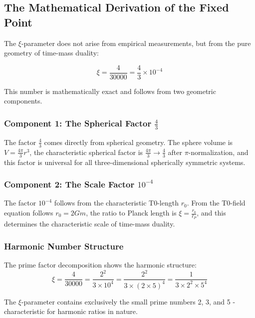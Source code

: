 \documentclass[12pt,a4paper]{report}
\begin{document}
	\subsection{The Mathematical Derivation of the Fixed Point}
	
	The $\xi$-parameter does not arise from empirical measurements, but from the pure geometry of time-mass duality:
	
	\begin{equation}
		\xi = \frac{4}{30000} = \frac{4}{3} \times 10^{-4}
	\end{equation}
	
	This number is mathematically exact and follows from two geometric components.
	
	\subsubsection{Component 1: The Spherical Factor $\frac{4}{3}$}
	
	The factor $\frac{4}{3}$ comes directly from spherical geometry. The sphere volume is $V = \frac{4\pi}{3}r^3$, the characteristic spherical factor is $\frac{4\pi}{3} \rightarrow \frac{4}{3}$ after $\pi$-normalization, and this factor is universal for all three-dimensional spherically symmetric systems.
	
	\subsubsection{Component 2: The Scale Factor $10^{-4}$}
	
	The factor $10^{-4}$ follows from the characteristic T0-length $r_0$. From the T0-field equation follows $r_0 = 2Gm$, the ratio to Planck length is $\xi = \frac{r_0}{\ell_P}$, and this determines the characteristic scale of time-mass duality.
	
	\subsubsection{Harmonic Number Structure}
	
	The prime factor decomposition shows the harmonic structure:
	\begin{equation}
		\xi = \frac{4}{30000} = \frac{2^2}{3 \times 10^4} = \frac{2^2}{3 \times (2 \times 5)^4} = \frac{1}{3 \times 2^2 \times 5^4}
	\end{equation}
	
	The $\xi$-parameter contains exclusively the small prime numbers 2, 3, and 5 - characteristic for harmonic ratios in nature.
	
\end{document}
